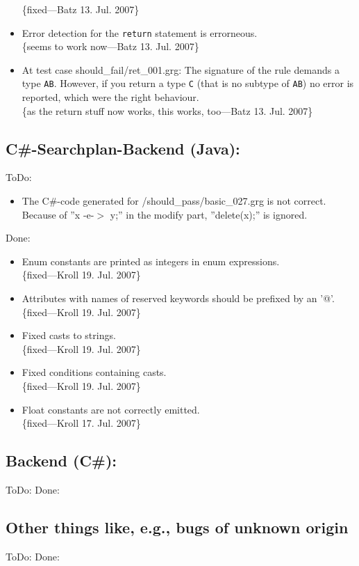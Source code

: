 \documentclass[12pt,a4paper]{article}
\begin{document}
\begin{itemize}
    \{fixed---Batz 13. Jul. 2007\}
	\item Error detection for the {\tt return} statement is errorneous.\\
		\{seems to work now---Batz 13. Jul. 2007\}
	\item At test case should\_fail/ret\_001.grg:
  	The signature of the rule demands a type {\tt AB}.
	However, if you return a type {\tt C} (that is no subtype of {\tt AB}) no error is reported, which were the right behaviour.\\
		\{as the return stuff now works, this works, too---Batz 13. Jul. 2007\}
\end{itemize}



\subsection*{C\#-Searchplan-Backend (Java):}
ToDo:
\begin{itemize}
	\item The C\#-code generated for {/should\_pass/basic\_027.grg} is not correct. Because of ''x -e-$>$ y;'' in the modify part, ''delete(x);'' is ignored.
\end{itemize}
Done:
\begin{itemize}
    \item Enum constants are printed as integers in enum expressions.\\
    \{fixed---Kroll 19. Jul. 2007\}
    \item Attributes with names of reserved keywords should be prefixed by an '@'.\\
    \{fixed---Kroll 19. Jul. 2007\}
    \item Fixed casts to strings.\\
    \{fixed---Kroll 19. Jul. 2007\}
    \item Fixed conditions containing casts.\\
    \{fixed---Kroll 19. Jul. 2007\}
    \item Float constants are not correctly emitted.\\
    \{fixed---Kroll 17. Jul. 2007\}
\end{itemize}


\subsection*{Backend (C\#):}
ToDo:
Done:



\subsection*{Other things like, e.g., bugs of unknown origin}
ToDo:
Done:
\end{document}

